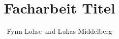 \documentclass[12pt, ngerman]{article}
\author{Fynn Lohse und Lukas Middelberg}
\title{Facharbeit Titel}
\begin{document}
\begin{titlepage}
\maketitle
\end{titlepage}

\tableofcontents





\end{document}
